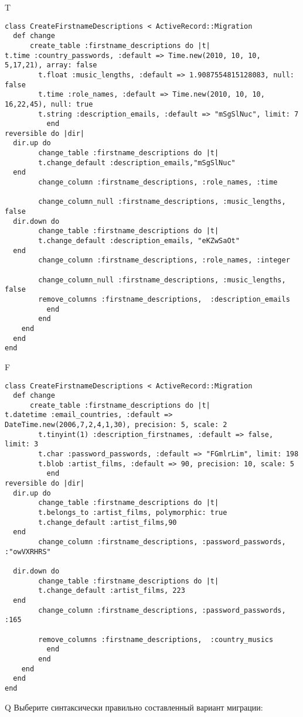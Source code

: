 T
\begin{verbatim}
class CreateFirstnameDescriptions < ActiveRecord::Migration
  def change
	  create_table :firstname_descriptions do |t|
t.time :country_passwords, :default => Time.new(2010, 10, 10, 5,17,21), array: false
		t.float :music_lengths, :default => 1.9087554815128083, null: false
		t.time :role_names, :default => Time.new(2010, 10, 10, 16,22,45), null: true
		t.string :description_emails, :default => "mSgSlNuc", limit: 7
		  end
reversible do |dir|
  dir.up do
		change_table :firstname_descriptions do |t|
		t.change_default :description_emails,"mSgSlNuc"
  end
 		change_column :firstname_descriptions, :role_names, :time
   
		change_column_null :firstname_descriptions, :music_lengths,  false
  dir.down do
		change_table :firstname_descriptions do |t|
		t.change_default :description_emails, "eKZwSaOt"
  end
 		change_column :firstname_descriptions, :role_names, :integer
   
		change_column_null :firstname_descriptions, :music_lengths, false
 		remove_columns :firstname_descriptions,  :description_emails 
	      end
	    end
    end 
  end
end

\end{verbatim}

F
\begin{verbatim}
class CreateFirstnameDescriptions < ActiveRecord::Migration
  def change
	  create_table :firstname_descriptions do |t|
t.datetime :email_countries, :default => DateTime.new(2006,7,2,4,1,30), precision: 5, scale: 2
		t.tinyint(1) :description_firstnames, :default => false, limit: 3
		t.char :password_passwords, :default => "FGmlrLim", limit: 198
		t.blob :artist_films, :default => 90, precision: 10, scale: 5
		  end
reversible do |dir|
  dir.up do
		change_table :firstname_descriptions do |t|
		t.belongs_to :artist_films, polymorphic: true
 		t.change_default :artist_films,90
  end
 		change_column :firstname_descriptions, :password_passwords, :"owVXRHRS"
   
  dir.down do
		change_table :firstname_descriptions do |t|
		t.change_default :artist_films, 223
  end
 		change_column :firstname_descriptions, :password_passwords, :165
   
		remove_columns :firstname_descriptions,  :country_musics 
	      end
	    end
    end 
  end
end

\end{verbatim}

Q
Выберите синтаксически правильно составленный вариант миграции:

